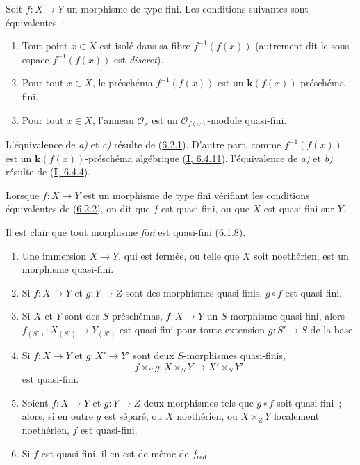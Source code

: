 \begin{corollary}[6.2.2]
\label{II.6.2.2-fr}
Soit $f:X\to Y$ un morphisme de type fini. Les conditions suivantes sont
équivalentes~:
\begin{enumerate}
\item[\textup{a)}] Tout point $x\in X$ est isolé dans sa fibre $f^{-1}(f(x))$
\textup{(autrement dit le sous-espace $f^{-1}(f(x))$ est \emph{discret})}.
\item[\textup{b)}] Pour tout $x\in X$, le préschéma $f^{-1}(f(x))$ est un
$\boldsymbol{k}(f(x))$-préschéma fini.
\item[\textup{c)}] Pour tout $x\in X$, l'anneau $\mathcal{O}_x$ est un
$\mathcal{O}_{f(x)}$-module quasi-fini.
\end{enumerate}
\end{corollary}

L'équivalence de \emph{a)} et \emph{c)} résulte de
(\hyperref[II.6.2.1-fr]{6.2.1}). D'autre part, comme $f^{-1}(f(x))$ est un
$\boldsymbol{k}(f(x))$-préschéma algébrique (\hyperref[I.6.4.11-fr]{\textbf{I}, 6.4.11}),
l'équivalence de \emph{a)} et \emph{b)} résulte de (\hyperref[I.6.4.4-fr]{\textbf{I}, 6.4.4}).

\begin{definition}[6.2.3]
\label{II.6.2.3-fr}
Lorsque $f:X\to Y$ est un morphisme de type fini vérifiant les conditions
équivalentes de \textup{(\hyperref[II.6.2.2-fr]{6.2.2})}, on dit que $f$ est
quasi-fini, ou que $X$ est quasi-fini sur $Y$.
\end{definition}

Il est clair que tout morphisme \emph{fini} est quasi-fini
(\hyperref[II.6.1.8-fr]{6.1.8}).

\begin{proposition}[6.2.4]
\label{II.6.2.4-fr}
\begin{enumerate}
\item[\textup{(i)}] Une immersion $X\to Y$, qui est fermée, ou telle que $X$ soit
noethérien, est un morphisme quasi-fini.
\item[\textup{(ii)}] Si $f:X\to Y$ et $g:Y\to Z$ sont des morphismes quasi-finis,
$g\circ f$ est quasi-fini.
\item[\textup{(iii)}] Si $X$ et $Y$ sont des $S$-préschémas, $f:X\to Y$ un
$S$-morphisme quasi-fini, alors $f_{(S')}:X_{(S')}\to Y_{(S')}$ est quasi-fini
pour toute extension $g:S'\to S$ de la base.
\item[\textup{(iv)}] Si $f:X\to Y$ et $g:X'\to Y'$ sont deux $S$-morphismes
quasi-finis,
\[
f\times_S g:X\times_S Y\to X'\times_S Y'
\]
est quasi-fini.
\item[\textup{(v)}] Soient $f:X\to Y$ et $g:Y\to Z$ deux morphismes tels que $g\circ
f$ soit quasi-fini~; alors, si en outre $g$ est séparé, ou $X$ noethérien, ou
$X\times_ZY$ localement noethérien, $f$ est quasi-fini.
\item[\textup{(vi)}] Si $f$ est quasi-fini, il en est de même de $f_{\mathrm{red}}$.
\end{enumerate}
\end{proposition}

